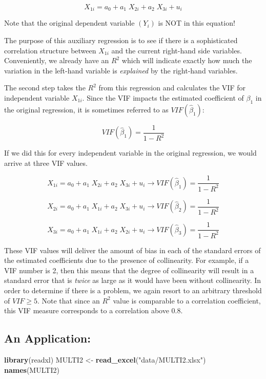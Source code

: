 \documentclass[
]{book}
\newenvironment{Shaded}{\begin{snugshade}}{\end{snugshade}}
\newcommand{\FunctionTok}[1]{\textcolor[rgb]{0.13,0.29,0.53}{\textbf{#1}}}
\newcommand{\NormalTok}[1]{#1}
\newcommand{\OtherTok}[1]{\textcolor[rgb]{0.56,0.35,0.01}{#1}}
\newcommand{\StringTok}[1]{\textcolor[rgb]{0.31,0.60,0.02}{#1}}
\begin{document}
\[X_{1i} = a_0 + a_1\;  X_{2i} + a_2 \; X_{3i} + u_i\]

Note that the original dependent variable \((Y_i)\) is NOT in this equation!

The purpose of this auxiliary regression is to see if there is a sophisticated correlation structure between \(X_{1i}\) and the current right-hand side variables. Conveniently, we already have an \(R^2\) which will indicate exactly how much the variation in the left-hand variable is \emph{explained} by the right-hand variables.

The second step takes the \(R^2\) from this regression and calculates the VIF for independent variable \(X_{1i}\). Since the VIF impacts the estimated coefficient of \(\beta_1\) in the original regression, it is sometimes referred to as \(VIF(\hat{\beta}_1)\):

\[VIF(\hat{\beta}_1) = \frac{1}{1-R^2}\]

If we did this for every independent variable in the original regression, we would arrive at three VIF values.

\[X_{1i} = a_0 + a_1 \; X_{2i} + a_2\;  X_{3i} + u_i \rightarrow VIF(\hat{\beta}_1) = \frac{1}{1-R^2}\]

\[X_{2i} = a_0 + a_1 \; X_{1i} + a_2 \; X_{3i} + u_i \rightarrow VIF(\hat{\beta}_2) = \frac{1}{1-R^2}\]

\[X_{3i} = a_0 + a_1 \; X_{1i} + a_2 \; X_{2i} + u_i \rightarrow VIF(\hat{\beta}_3) = \frac{1}{1-R^2}\]

These VIF values will deliver the amount of bias in each of the standard errors of the estimated coefficients due to the presence of collinearity. For example, if a VIF number is 2, then this means that the degree of collinearity will result in a standard error that is \emph{twice} as large as it would have been without collinearity. In order to determine if there is a problem, we again resort to an arbitrary threshold of \(VIF \geq 5\). Note that since an \(R^2\) value is comparable to a correlation coefficient, this VIF measure corresponds to a correlation above 0.8.

\subsection{An Application:}\label{an-application-2}

\begin{Shaded}
\begin{Highlighting}[]
\FunctionTok{library}\NormalTok{(readxl)}
\NormalTok{MULTI2 }\OtherTok{\textless{}{-}} \FunctionTok{read\_excel}\NormalTok{(}\StringTok{"data/MULTI2.xlsx"}\NormalTok{)}
\FunctionTok{names}\NormalTok{(MULTI2)}
\end{Highlighting}
\end{Shaded}
\end{document}
